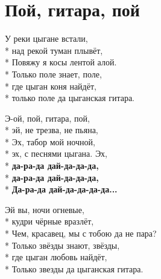 \vspace{\fill}\newpage

\section{Пой, гитара, пой}
\label{song:Пой,_гитара,_пой}

\medskip

\begin{minipage}{\linewidth}
У реки цыгане встали,\\*
над рекой туман плывёт,\\*
Повяжу я косы лентой алой.\\*
Только поле знает, поле,\\*
где цыган коня найдёт,\\*
только поле да цыганская гитара.\\
\end{minipage}\par\medskip\nobreak

\medskip

\begin{minipage}{\linewidth}
\hspace*{1.5em}Э-ой, пой, гитара, пой,\\*
\hspace*{1.5em}эй, не трезва, не пьяна,\\*
\hspace*{1.5em}Эх, табор мой ночной,\\*
\hspace*{1.5em}эх, с песнями цыгана. Эх,\\*
\hspace*{1.5em}\textbf{да-ра-да дай-да-да-да,}\\*
\hspace*{1.5em}\textbf{да-ра-да дай-да-да-да,}\\*
\hspace*{1.5em}\textbf{Да-ра-да дай-да-да-да-да...}\\
\end{minipage}\par\medskip\nobreak

\medskip

\begin{minipage}{\linewidth}
Эй вы, ночи огневые,\\*
кудри чёрные вразлёт,\\*
Чем, красавец, мы с тобою да не пара?\\*
Только звёзды знают, звёзды,\\*
где цыган любовь найдёт,\\*
Только звезды да цыганская гитара.\\
\end{minipage}\par\medskip\nobreak

